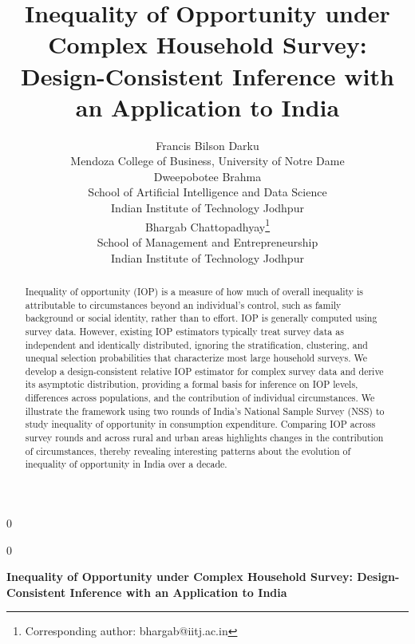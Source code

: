 \documentclass[12pt]{article}
\theoremstyle{plain}
\theoremstyle{definition}
\newcommand{\anon}{0}
\begin{document}
\def\spacingset#1{\renewcommand{\baselinestretch}%
{#1}\small\normalsize} \spacingset{1}




\anon
{
  \title{\bf Inequality of Opportunity under Complex Household Survey: Design-Consistent Inference with an Application to India}
  \author{Francis Bilson Darku\\
    Mendoza College of Business, University of Notre Dame
    \vspace{0.3cm}\\
    Dweepobotee Brahma \\
   School of Artificial Intelligence and Data Science\\
   Indian Institute of Technology Jodhpur\vspace{0.3cm}\\
   Bhargab Chattopadhyay\thanks{Corresponding author: bhargab@iitj.ac.in} \\
   School of Management and Entrepreneurship\\
   Indian Institute of Technology Jodhpur
   }
  \maketitle
} \fi

\anon
{
  \bigskip
  \bigskip
  \bigskip
  \begin{center}
    {\LARGE\bf Inequality of Opportunity under Complex Household Survey: Design-Consistent Inference with an Application to India}
\end{center}
  \medskip
} \fi

\bigskip
\begin{abstract}
Inequality of opportunity (IOP) is a measure of how much of overall inequality is attributable to circumstances beyond an individual's control, such as family background or social identity, rather than to effort. IOP is generally computed using survey data. However, existing IOP estimators typically treat survey data as independent and identically distributed, ignoring the stratification, clustering, and unequal selection probabilities that characterize most large household surveys. We develop a design-consistent relative IOP estimator for complex survey data and derive its asymptotic distribution, providing a formal basis for inference on IOP levels,
differences across populations, and the contribution of individual circumstances. We illustrate
the framework using two rounds of India's National Sample Survey (NSS) to study inequality of
opportunity in consumption expenditure. Comparing IOP across survey rounds and across rural and urban areas highlights changes in the contribution of circumstances, thereby revealing interesting patterns about the evolution of inequality of opportunity in India over a decade.
\end{abstract}
\end{document}
